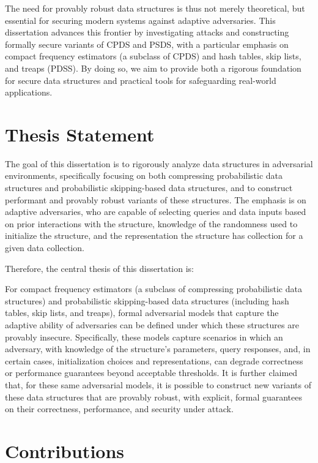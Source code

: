 The need for provably robust data structures is thus not merely theoretical, but essential for securing modern systems against adaptive adversaries. This dissertation advances this frontier by investigating attacks and constructing formally secure variants of CPDS and PSDS, with a particular emphasis on compact frequency estimators (a subclass of CPDS) and hash tables, skip lists, and treaps (PDSS). By doing so, we aim to provide both a rigorous foundation for secure data structures and practical tools for safeguarding real-world applications.

\section{Thesis Statement}

The goal of this dissertation is to rigorously analyze data structures in adversarial environments, specifically focusing on both compressing probabilistic data structures and probabilistic skipping-based data structures, and to construct performant and provably robust variants of these structures. The emphasis is on adaptive adversaries, who are capable of selecting queries and data inputs based on prior interactions with the structure, knowledge of the randomness used to initialize the structure, and the representation the structure has collection for a given data collection.

Therefore, the central thesis of this dissertation is:

For compact frequency estimators (a subclass of compressing probabilistic data structures) and probabilistic skipping-based data structures (including hash tables, skip lists, and treaps), formal adversarial models that capture the adaptive ability of adversaries can be defined under which these structures are provably insecure. Specifically, these models capture scenarios in which an adversary, with knowledge of the structure’s parameters, query responses, and, in certain cases, initialization choices and representations, can degrade correctness or performance guarantees beyond acceptable thresholds. It is further claimed that, for these same adversarial models, it is possible to construct new variants of these data structures that are provably robust, with explicit, formal guarantees on their correctness, performance, and security under attack.

\section{Contributions}

